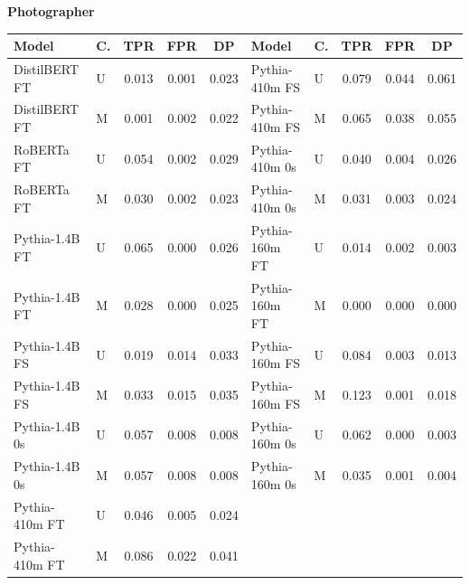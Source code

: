 \documentclass[11pt]{article}
\begin{document}
\vspace{4pt}\noindent\textbf{Photographer}
\begin{center}\scriptsize
\begin{tabular}{llccc|llccc}
\toprule
\textbf{Model} & \textbf{C.} & \textbf{TPR} & \textbf{FPR} & \textbf{DP} & \textbf{Model} & \textbf{C.} & \textbf{TPR} & \textbf{FPR} & \textbf{DP} \\
\midrule
DistilBERT FT & U & 0.013 & 0.001 & 0.023 & Pythia-410m FS & U & 0.079 & 0.044 & 0.061 \\
DistilBERT FT & M & 0.001 & 0.002 & 0.022 & Pythia-410m FS & M & 0.065 & 0.038 & 0.055 \\
RoBERTa FT & U & 0.054 & 0.002 & 0.029 & Pythia-410m 0s & U & 0.040 & 0.004 & 0.026 \\
RoBERTa FT & M & 0.030 & 0.002 & 0.023 & Pythia-410m 0s & M & 0.031 & 0.003 & 0.024 \\
Pythia-1.4B FT & U & 0.065 & 0.000 & 0.026 & Pythia-160m FT & U & 0.014 & 0.002 & 0.003 \\
Pythia-1.4B FT & M & 0.028 & 0.000 & 0.025 & Pythia-160m FT & M & 0.000 & 0.000 & 0.000 \\
Pythia-1.4B FS & U & 0.019 & 0.014 & 0.033 & Pythia-160m FS & U & 0.084 & 0.003 & 0.013 \\
Pythia-1.4B FS & M & 0.033 & 0.015 & 0.035 & Pythia-160m FS & M & 0.123 & 0.001 & 0.018 \\
Pythia-1.4B 0s & U & 0.057 & 0.008 & 0.008 & Pythia-160m 0s & U & 0.062 & 0.000 & 0.003 \\
Pythia-1.4B 0s & M & 0.057 & 0.008 & 0.008 & Pythia-160m 0s & M & 0.035 & 0.001 & 0.004 \\
Pythia-410m FT & U & 0.046 & 0.005 & 0.024 & & & & & \\
Pythia-410m FT & M & 0.086 & 0.022 & 0.041 & & & & & \\
\bottomrule
\end{tabular}
\end{center}
\end{document}
